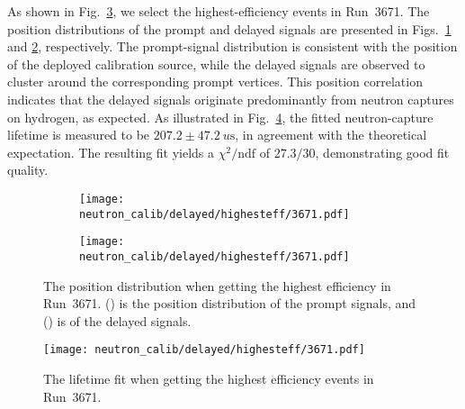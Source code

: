 As shown in Fig.~\ref{fig:highestEffPos}, we select the highest-efficiency events in Run~3671.
The position distributions of the prompt and delayed signals are presented in Figs.~\ref{fig:3671HighestEffProPos} and \ref{fig:3671HighestEffDelPos}, respectively.
The prompt-signal distribution is consistent with the position of the deployed calibration source, while the delayed signals are observed to cluster around the corresponding prompt vertices.
This position correlation indicates that the delayed signals originate predominantly from neutron captures on hydrogen, as expected.
As illustrated in Fig.~\ref{fig:3671_HighestEffDtFit}, the fitted neutron-capture lifetime is measured to be $207.2 \pm \SI{47.2}{u\second}$, in agreement with the theoretical expectation.
The resulting fit yields a $\chi^{2}/\mathrm{ndf}$ of $27.3/30$, demonstrating good fit quality.

\begin{figure}[htbp]
	\begin{subfigure}{0.5\textwidth}
		\centering
		\texttt{[image: neutron\_calib/delayed/highesteff/3671.pdf]}
		\caption{}
		\label{fig:3671HighestEffProPos}
	\end{subfigure}%
	\begin{subfigure}{0.5\textwidth}
		\centering
		\texttt{[image: neutron\_calib/delayed/highesteff/3671.pdf]}
		\caption{}
		\label{fig:3671HighestEffDelPos}
	\end{subfigure}
	\caption{The position distribution when getting the highest efficiency in Run~3671. () is the position distribution of the prompt signals, and () is of the delayed signals.}
	\label{fig:highestEffPos}
\end{figure}
\begin{figure}[H]
	\centering
	\texttt{[image: neutron\_calib/delayed/highesteff/3671.pdf]}
	\caption{The lifetime fit when getting the highest efficiency events in Run~3671.}
	\label{fig:3671_HighestEffDtFit}
\end{figure}

